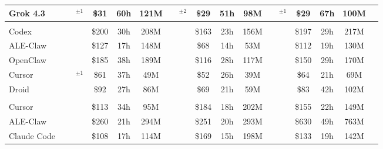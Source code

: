 \begin{table}[t]
{{\begin{tabular}{@{\hskip 4pt}l@{\hskip 6pt}ccccc@{\hskip 7pt}:ccccc@{\hskip 7pt}:ccccc@{\hskip 6pt}:c@{\hskip 4pt}}
Grok 4.3~\citep{xai2026models} &  & $^{\pm1}$ & \$31 & 60h & 121M &  & $^{\pm2}$ & \$29 & 51h & 98M &  & $^{\pm1}$ & \$29 & 67h & 100M &  \\
\midrule
{}
 \\
Codex~\citep{openai2025codex} &  &  & \$200 & 30h & 208M &  &  & \$163 & 23h & 156M &  &  & \$197 & 29h & 217M &  \\
ALE-Claw &  &  & \$127 & 17h & 148M &  &  & \$68 & 14h & 53M &  &  & \$112 & 19h & 130M &  \\
OpenClaw~\citep{openclaw2026agent} &  &  & \$185 & 38h & 189M &  &  & \$116 & 28h & 117M &  &  & \$150 & 29h & 170M &  \\
Cursor~\citep{cursor2025cli} &  & $^{\pm1}$ & \$61 & 37h & 49M &  &  & \$52 & 26h & 39M &  &  & \$64 & 21h & 69M &  \\
Droid~\citep{docker2026droid} &  &  & \$92 & 27h & 86M &  &  & \$69 & 21h & 59M &  &  & \$83 & 42h & 102M &  \\
\midrule
{}
 \\
Cursor~\citep{cursor2025cli} &  &  & \$113 & 34h & 95M &  &  & \$184 & 18h & 202M &  &  & \$155 & 22h & 149M &  \\
ALE-Claw &  &  & \$260 & 21h & 294M &  &  & \$251 & 20h & 293M &  &  & \$630 & 49h & 763M &  \\
Claude Code~\citep{anthropic2025claudecode} &  &  & \$108 & 17h & 114M &  &  & \$169 & 15h & 198M &  &  & \$133 & 19h & 142M &  \\
\bottomrule
\end{tabular}}\par
\vspace{.35em}
\par
}
\end{table}
